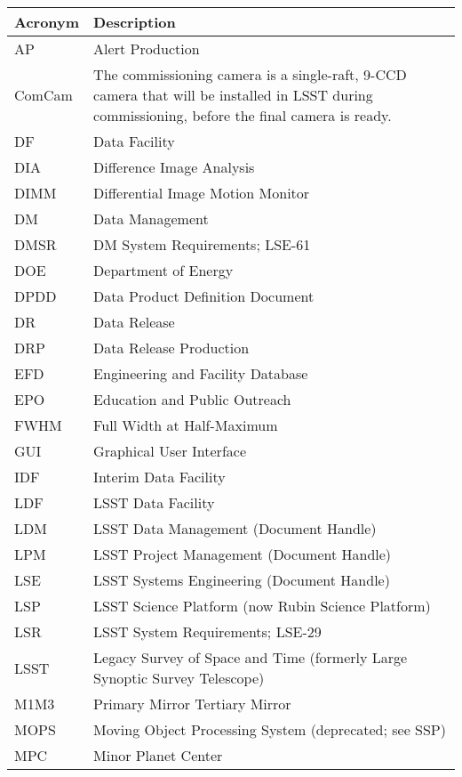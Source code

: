 \addtocounter{table}{-1}
\begin{longtable}{p{}p{}}\hline
\textbf{Acronym} & \textbf{Description}  \\\hline

AP & Alert Production \\\hline
ComCam & The commissioning camera is a single-raft, 9-CCD camera that will be installed in LSST during commissioning, before the final camera is ready. \\\hline
DF & Data Facility \\\hline
DIA & Difference Image Analysis \\\hline
DIMM & Differential Image Motion Monitor \\\hline
DM & Data Management \\\hline
DMSR & DM System Requirements; LSE-61 \\\hline
DOE & Department of Energy \\\hline
DPDD & Data Product Definition Document \\\hline
DR & Data Release \\\hline
DRP & Data Release Production \\\hline
EFD & Engineering and Facility Database \\\hline
EPO & Education and Public Outreach \\\hline
FWHM & Full Width at Half-Maximum \\\hline
GUI & Graphical User Interface \\\hline
IDF & Interim Data Facility \\\hline
LDF & LSST Data Facility \\\hline
LDM & LSST Data Management (Document Handle) \\\hline
LPM & LSST Project Management (Document Handle) \\\hline
LSE & LSST Systems Engineering (Document Handle) \\\hline
LSP & LSST Science Platform (now Rubin Science Platform) \\\hline
LSR & LSST System Requirements; LSE-29 \\\hline
LSST & Legacy Survey of Space and Time (formerly Large Synoptic Survey Telescope) \\\hline
M1M3 & Primary Mirror Tertiary Mirror \\\hline
MOPS & Moving Object Processing System (deprecated; see SSP) \\\hline
MPC & Minor Planet Center \\\hline

\end{longtable}
